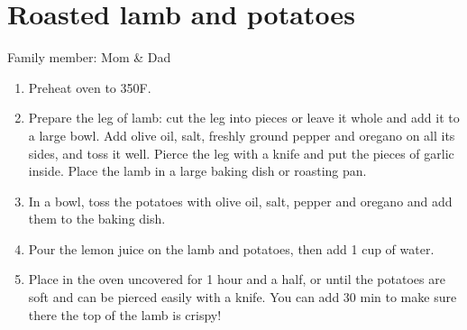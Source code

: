\chapter{Roasted lamb and potatoes}
\label{ch:lambpotatoes}

Family member: Mom \& Dad



\begin{enumerate}
    \item Preheat oven to 350\degree F.
    \item Prepare the leg of lamb: cut the leg into pieces or leave it whole and add it to a large bowl.  Add olive oil, salt, freshly ground pepper and oregano on all its sides, and toss it well. Pierce the leg with a knife and put the pieces of garlic inside. Place the lamb in a large baking dish or roasting pan.
    \item In a bowl, toss the potatoes with olive oil, salt, pepper and oregano and add them to the baking dish.
    \item Pour the lemon juice on the lamb and potatoes, then add 1 cup of water.
    \item Place in the oven uncovered for 1 hour and a half, or until the potatoes are soft and can be pierced easily with a knife. You can add 30 min to make sure there the top of the lamb is crispy!
\end{enumerate}

